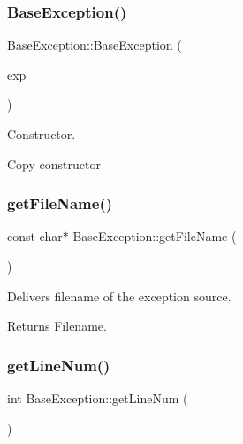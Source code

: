 \subsubsection{\texorpdfstring{Base\+Exception()}{BaseException()}\hspace{0.1cm}{\footnotesize\ttfamily [2/2]}}
{\footnotesize\ttfamily Base\+Exception\+::\+Base\+Exception (\begin{DoxyParamCaption}\item[{const \hyperlink{classBaseException}{Base\+Exception} \&}]{exp }\end{DoxyParamCaption})\hspace{0.3cm}{\ttfamily [inline]}}

Constructor.

Copy constructor \mbox{\label{group__EXCEPT__GROUP_gaeea140646898fbe7642cd2dc13b2b22c}} 
\subsubsection{\texorpdfstring{get\+File\+Name()}{getFileName()}}
{\footnotesize\ttfamily const char$\ast$ Base\+Exception\+::get\+File\+Name (\begin{DoxyParamCaption}{ }\end{DoxyParamCaption})\hspace{0.3cm}{\ttfamily [inline]}}

Delivers filename of the exception source. \begin{DoxyReturn}{Returns}
Filename. 
\end{DoxyReturn}
\mbox{\label{group__EXCEPT__GROUP_ga70bef940bbfd7bb2cc50b8150e1bded2}} 
\subsubsection{\texorpdfstring{get\+Line\+Num()}{getLineNum()}}
{\footnotesize\ttfamily int Base\+Exception\+::get\+Line\+Num (\begin{DoxyParamCaption}{ }\end{DoxyParamCaption})\hspace{0.3cm}{\ttfamily [inline]}}

